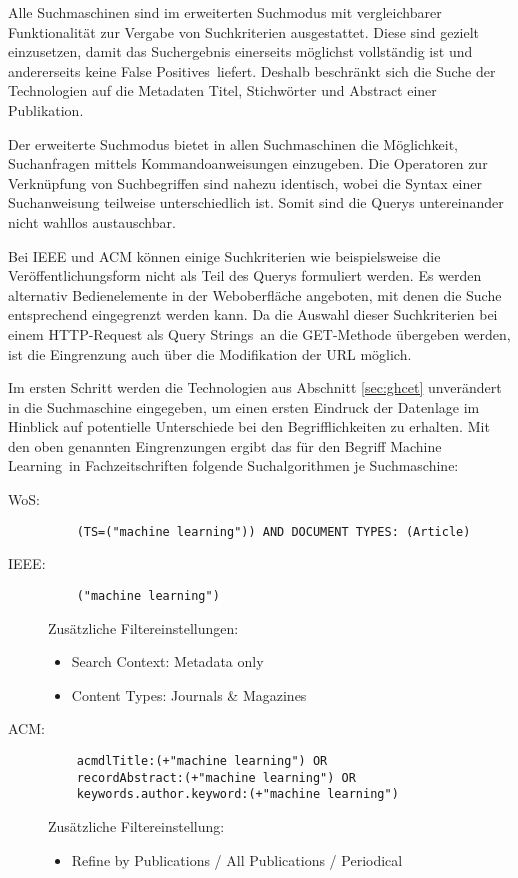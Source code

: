 Alle Suchmaschinen sind im erweiterten Suchmodus mit vergleichbarer Funktionalität zur Vergabe von Suchkriterien ausgestattet. Diese sind gezielt einzusetzen, damit das Suchergebnis einerseits möglichst vollständig ist und andererseits keine \glqq False Positives\grqq~liefert. Deshalb beschränkt sich die Suche der Technologien auf die Metadaten Titel, Stichwörter und Abstract einer Publikation.

Der erweiterte Suchmodus bietet in allen Suchmaschinen die Möglichkeit, Suchanfragen mittels Kommandoanweisungen einzugeben. Die Operatoren zur Verknüpfung von Suchbegriffen sind nahezu identisch, wobei die Syntax einer Suchanweisung teilweise unterschiedlich ist. Somit sind die Querys untereinander nicht wahllos austauschbar.

Bei IEEE und ACM können einige Suchkriterien wie beispielsweise die Veröffentlichungsform nicht als Teil des Querys formuliert werden. Es werden alternativ Bedienelemente in der Web\-oberfläche angeboten, mit denen die Suche entsprechend eingegrenzt werden kann. Da die Auswahl dieser Suchkriterien bei einem HTTP-Request als \glqq Query Strings\grqq~an die GET-Methode übergeben werden, ist die Eingrenzung auch über die Modifikation der URL möglich.

Im ersten Schritt werden die Technologien aus Abschnitt \ref{sec:ghcet} unverändert in die Suchmaschine eingegeben, um einen ersten Eindruck der Datenlage im Hinblick auf potentielle Unterschiede bei den Begrifflichkeiten zu erhalten. Mit den oben genannten Eingrenzungen ergibt das für den Begriff \glqq Machine Learning\grqq~in Fachzeitschriften folgende Suchalgorithmen je Suchmaschine:

\begin{description}
	\item [WoS:] \begin{verbatim}
	(TS=("machine learning")) AND DOCUMENT TYPES: (Article)
	\end{verbatim}

	\item [IEEE:] \begin{verbatim}
	("machine learning")
	\end{verbatim}
	Zusätzliche Filtereinstellungen:
	\begin{itemize}
		\item Search Context: Metadata only
		\item Content Types: Journals \& Magazines
	\end{itemize}

	\item [ACM:] \begin{verbatim}
	acmdlTitle:(+"machine learning") OR
	recordAbstract:(+"machine learning") OR
	keywords.author.keyword:(+"machine learning")
	\end{verbatim}
	Zusätzliche Filtereinstellung:
	\begin{itemize}
		\item Refine by Publications / All Publications / Periodical
	\end{itemize}
\end{description}

